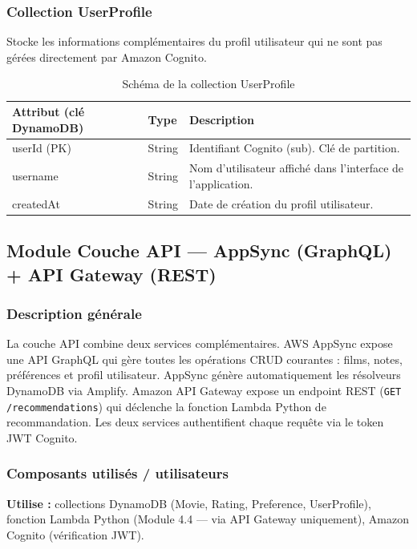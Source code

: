 \documentclass[a4paper,12pt]{report}
\begin{document}
\subsubsection{Collection UserProfile}

Stocke les informations complémentaires du profil utilisateur qui ne sont pas gérées directement par Amazon Cognito.

\begin{table}[htbp]
\centering
\begin{tabular}{llp{8cm}}
\toprule
\textbf{Attribut (clé DynamoDB)} & \textbf{Type} & \textbf{Description} \\
\midrule
userId (PK) & String & Identifiant Cognito (sub). Clé de partition. \\

username & String & Nom d'utilisateur affiché dans l'interface de l'application. \\

createdAt & String & Date de création du profil utilisateur. \\

\bottomrule
\end{tabular}
\caption{Schéma de la collection UserProfile}
\end{table}
\newpage

\subsection{Module Couche API — AppSync (GraphQL) + API Gateway (REST)}
\label{api}
\subsubsection{Description générale}

La couche API combine deux services complémentaires. AWS AppSync expose une API GraphQL qui gère toutes les opérations CRUD courantes : films, notes, préférences et profil utilisateur. AppSync génère automatiquement les résolveurs DynamoDB via Amplify. Amazon API Gateway expose un endpoint REST (\texttt{GET /recommendations}) qui déclenche la fonction Lambda Python de recommandation. Les deux services authentifient chaque requête via le token JWT Cognito.

\subsubsection{Composants utilisés / utilisateurs}

\textbf{Utilise :} collections DynamoDB (Movie, Rating, Preference, UserProfile), fonction Lambda Python (Module 4.4 — via API Gateway uniquement), Amazon Cognito (vérification JWT).
\end{document}
